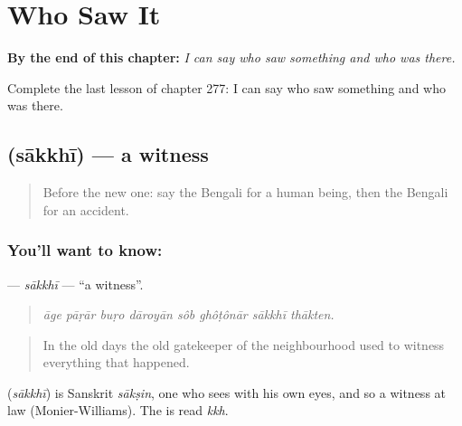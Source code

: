 
\chapter{Who Saw It}
\label{ch:bn-who-saw-it}

\begin{chapteropening}
\textbf{By the end of this chapter:} \emph{I can say who saw something and who was there.}

Complete the last lesson of chapter 277: I can say who saw something and who was there.
\end{chapteropening}

\section[\texorpdfstring{\bn{সাক্ষী} (sākkhī)}{সাক্ষী (sākkhī)}]{ (sākkhī) — a witness}

\label{lesson:BN-C277-sakkhi}



\begin{quote}
Before the new one: say the Bengali for a human being, then the Bengali for an accident.
\end{quote}

\subsection*{You'll want to know: }
\textbf{} — \emph{sākkhī} — \textquotedblleft{}a witness\textquotedblright{}.

\begin{quote}
       
\end{quote}

\begin{quote}
\emph{āge pāṛār buṛo dāroyān sôb ghôṭônār sākkhī thākten.}
\end{quote}

\begin{quote}
In the old days the old gatekeeper of the neighbourhood used to witness everything that happened.
\end{quote}

\begin{cousinweb}
\textbf{} (\emph{sākkhī}) is Sanskrit \emph{sākṣin}, one who sees with his own eyes, and so a witness at law (Monier-Williams). The  is read \emph{kkh}.
\end{cousinweb}

